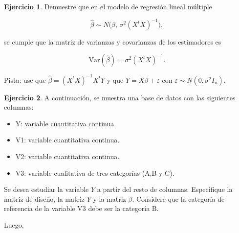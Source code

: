 \documentclass[
  11pt,
]{book}
\providecommand{\tightlist}{%
  \setlength{\itemsep}{0pt}\setlength{\parskip}{0pt}}
\theoremstyle{definition}
\theoremstyle{definition}
\theoremstyle{definition}
\newtheorem{exercise}{Ejercicio}[chapter]
\theoremstyle{definition}
\theoremstyle{remark}
\begin{document}
\begin{exercise}
Demuestre que en el modelo de regresión lineal múltiple

\[
\hat{\beta} \sim N\!\big(\beta, \, \sigma^2 (X^tX)^{-1}\big),
\]

se cumple que la matriz de varianzas y covarianzas de los estimadores es

\[
\mathrm{Var}(\hat{\beta}) = \sigma^2 (X^tX)^{-1}.
\]

Pista: use que \(\hat{\beta} = (X^tX)^{-1}X^tY\) y que \(Y = X\beta + \varepsilon\) con \(\varepsilon \sim N(0, \sigma^2 I_n)\).
\end{exercise}

\begin{exercise}

A continuación, se muestra una base de datos con las siguientes columnas:

\begin{itemize}
\tightlist
\item
  Y: variable cuantitativa continua.
\item
  V1: variable cuantitativa continua.
\item
  V2: variable cuantitativa continua.
\item
  V3: variable cualitativa de tres categorías (A,B y C).
\end{itemize}

\begin{table}[H]
\centering
{}
\end{table}

Se desea estudiar la variable \(Y\) a partir del resto de columnas. Especifique la matriz de diseño, la matriz \(Y\) y la matriz \(\beta\). Considere que la categoría de referencia de la variable V3 debe ser la categoría B.

Luego,


\end{exercise}
\end{document}
